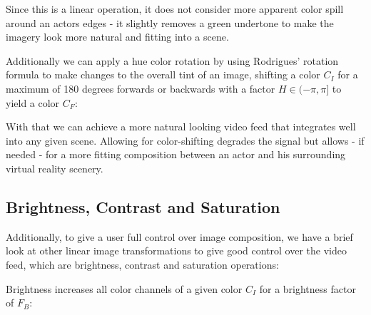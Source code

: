 


Since this is a linear operation, it does not consider more apparent color 
spill around an actors edges - it slightly removes a green undertone to make 
the imagery look more natural and fitting into a scene.

Additionally we can apply a hue color rotation by using Rodrigues' rotation 
formula to make changes to the overall tint of an image, shifting a color $C_I$ 
for a maximum of 180 degrees forwards or backwards with a factor $H \in (-\pi, 
\pi]$ to yield a color $C_F$:


With that we can achieve a more natural looking video feed that integrates well 
into any given scene. Allowing for color-shifting degrades the signal but 
allows - if needed - for a more fitting composition between an actor and his 
surrounding virtual reality scenery.

\subsection{Brightness, Contrast and Saturation}

Additionally, to give a user full control over image composition, we have a 
brief look at other linear image transformations to give good control over the 
video feed, which are brightness, contrast and saturation operations:

Brightness increases all color channels of a given color $C_I$ for a brightness 
factor of $F_B$:


